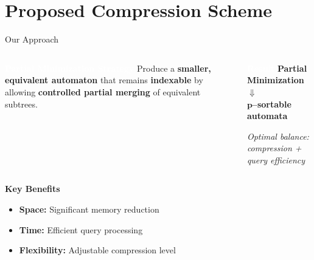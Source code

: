 \documentclass[aspectratio=169]{beamer}
\begin{document}
\section{Proposed Compression Scheme}
\begin{frame}{Our Approach}
	\begin{columns}[t]
		\begin{block}{\textcolor{white}{\textbf{Partial Minimization Strategy}}}
			Produce a \textcolor{oiGreen}{\textbf{smaller, equivalent automaton}} that remains \textcolor{oiBlue}{\textbf{indexable}} by allowing \textcolor{oiRed}{\textbf{controlled partial merging}} of equivalent subtrees.
		\end{block}

		\begin{block}{\textcolor{white}{\textbf{Result}}}
			\centering
			\textbf{Partial Minimization} \\
			$\Downarrow$ \\
			\textbf{$\mathbf{p}$--sortable automata}

			\vspace{0.3cm}
			\tiny
			\textit{Optimal balance: compression + query efficiency}
		\end{block}
	\end{columns}
	\vspace{0.5cm}
	\textbf{\textcolor{oiBlue}{Key Benefits}}
	\begin{itemize}
		\item \textbf{Space:} Significant memory reduction
		\item \textbf{Time:} Efficient query processing
		\item \textbf{Flexibility:} Adjustable compression level
	\end{itemize}
\end{frame}

\end{document}
